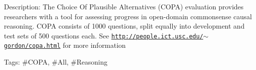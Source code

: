 Description\+: The Choice Of Plausible Alternatives (C\+O\+PA) evaluation provides researchers with a tool for assessing progress in open-\/domain commonsense causal reasoning. C\+O\+PA consists of 1000 questions, split equally into development and test sets of 500 questions each. See \href{http://people.ict.usc.edu/~gordon/copa.html}{\tt http\+://people.\+ict.\+usc.\+edu/$\sim$gordon/copa.\+html} for more information

Tags\+: \#\+C\+O\+PA, \#\+All, \#\+Reasoning 
